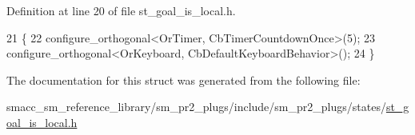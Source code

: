 Definition at line 20 of file st\+\_\+goal\+\_\+is\+\_\+local.\+h.


\begin{DoxyCode}
21     \{
22         configure\_orthogonal<OrTimer,  CbTimerCountdownOnce>(5);    
23         configure\_orthogonal<OrKeyboard, CbDefaultKeyboardBehavior>();
24     \}
\end{DoxyCode}


The documentation for this struct was generated from the following file\+:\begin{DoxyCompactItemize}
\item 
smacc\+\_\+sm\+\_\+reference\+\_\+library/sm\+\_\+pr2\+\_\+plugs/include/sm\+\_\+pr2\+\_\+plugs/states/\hyperlink{st__goal__is__local_8h}{st\+\_\+goal\+\_\+is\+\_\+local.\+h}\end{DoxyCompactItemize}
